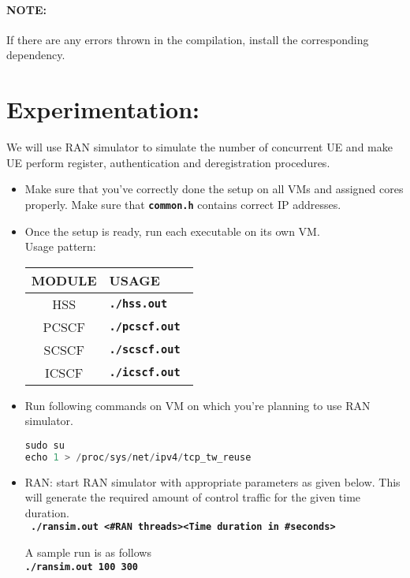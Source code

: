 \documentclass[hidelinks]{report}
\newcommand{\cf}[1] {
	\textbf{\texttt{#1}}
}
\begin{document}
\paragraph*{NOTE:} If there are any errors thrown in the compilation, install the corresponding dependency.  

\section*{Experimentation:}
We will use RAN simulator to simulate the number of concurrent UE and make UE perform register, authentication and deregistration procedures.

\begin{itemize}
\item Make sure that you've correctly done the setup on all VMs and assigned cores properly. Make sure that \cf{common.h} contains correct IP addresses.
\item Once the setup is ready, run each executable on its own VM.\\
Usage pattern: 
\begin{center}

\label{bin_format}
\def\arraystretch{1.5}

\begin{tabular}{|c|p{11.5 cm}|}

\hline
\textbf{MODULE} & \textbf{USAGE} \\
\hline
HSS & \cf{./hss.out } \\
PCSCF & \cf{./pcscf.out } \\
SCSCF & \cf{./scscf.out } \\
ICSCF & \cf{./icscf.out } \\
\hline

\end{tabular}
\end{center}

\item Run following commands on VM on which you're planning to use RAN simulator.
\begin{lstlisting}[language=c]
sudo su
echo 1 > /proc/sys/net/ipv4/tcp_tw_reuse 
\end{lstlisting}
\item RAN: start RAN simulator with appropriate parameters as given below. This will generate the required amount of control traffic for the given time duration. \\
\cf{
./ransim.out \textless \#RAN threads\textgreater \textless Time duration in \#seconds\textgreater\\}
A sample run is as follows \\
\cf{./ransim.out 100 300 }
\end{itemize}
\end{document}
